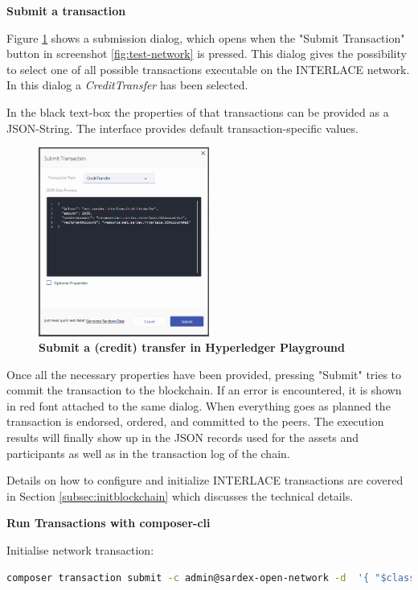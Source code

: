 \textbf{Submit a transaction}

Figure \ref{fig:submit-credit-transfer} shows a submission dialog, which opens when the "Submit Transaction" button in screenshot \ref{fig:test-network} is pressed. This dialog gives the possibility to select one of all possible transactions executable on the INTERLACE network. In this dialog a \textit{CreditTransfer} has been selected.

In the black text-box the properties of that transactions can be provided as a JSON-String. The interface provides default transaction-specific values.

\begin{figure}[htbp]
  \centering
  \includegraphics[width=0.5\textwidth]{Figures/submit-credit-transfer}
  \caption{\bf\small Submit a (credit) transfer in Hyperledger Playground}
  \label{fig:submit-credit-transfer}
\end{figure}

Once all the necessary properties have been provided, pressing "Submit" tries to commit the transaction to the blockchain. If an error is encountered, it is shown in red font attached to the same dialog. When everything goes as planned the transaction is endorsed, ordered, and committed to the peers. The execution results will finally show up in the JSON records used for the assets and participants as well as in the transaction log of the chain.

Details on how to configure and initialize INTERLACE transactions are covered in Section \ref{subsec:initblockchain} which discusses the technical details.

\textbf{Run Transactions with composer-cli}

Initialise network transaction:

\begin{lstlisting}[language=bash]
	composer transaction submit -c admin@sardex-open-network -d  '{ "$class": "net.sardex.interlace.InitBlockchain" }'
\end{lstlisting}

